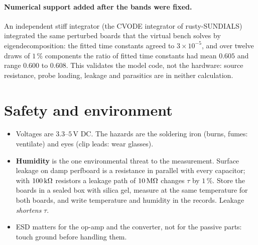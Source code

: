 \documentclass[11pt,a4paper]{article}
\begin{document}
\paragraph{Numerical support added after the bands were fixed.}
An independent stiff integrator (the CVODE integrator of rusty-SUNDIALS) integrated the same perturbed boards that the virtual bench solves by eigendecomposition: the fitted time constants agreed to $3\times10^{-5}$, and over twelve draws of $1\,\%$ components the ratio of fitted time constants had mean $0.605$ and range $0.600$ to $0.608$.
This validates the model code, not the hardware: source resistance, probe loading, leakage and parasitics are in neither calculation.

\section{Safety and environment}
\begin{itemize}
\item Voltages are $3.3$--$5$\,V DC. The hazards are the soldering iron (burns, fumes: ventilate) and eyes (clip leads: wear glasses).
\item \textbf{Humidity} is the one environmental threat to the measurement. Surface leakage on damp perfboard is a resistance in parallel with every capacitor; with $100\,{\rm k}\Omega$ resistors a leakage path of $10\,{\rm M}\Omega$ changes $\tau$ by $1\,\%$. Store the boards in a sealed box with silica gel, measure at the same temperature for both boards, and write temperature and humidity in the records. Leakage \emph{shortens} $\tau$.
\item ESD matters for the op-amp and the converter, not for the passive parts: touch ground before handling them.
\end{itemize}
\end{document}
